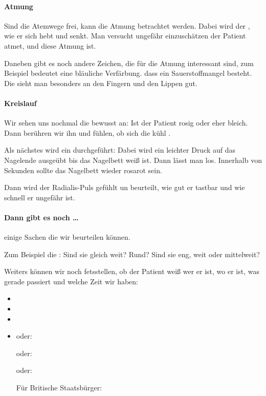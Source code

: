 \paragraph{Atmung} 
Sind die Atemwege frei, kann die Atmung
betrachtet werden. Dabei wird der , wie er sich hebt
und senkt. Man versucht ungefähr einzuschätzen 
der Patient atmet, und  diese Atmung ist.

Daneben gibt es noch andere Zeichen, die für die Atmung
interessant sind, zum Beispiel bedeutet eine bläuliche
Verfärbung. dass ein Sauerstoffmangel besteht. Die
 sieht man besonders an den Fingern und den
Lippen gut.


\paragraph{Kreislauf}

Wir sehen uns nochmal die  bewusst an: Ist
der Patient rosig oder eher bleich. Dann berühren wir ihn und
fühlen, ob sich die  kühl . 

Als nächstes wird ein  durchgeführt: Dabei
wird ein leichter Druck auf das Nagelende ausgeübt bis
das Nagelbett weiß ist. Dann lässt man los. Innerhalb von
 Sekunden sollte das Nagelbett wieder rosarot
sein. 



Dann wird der Radialis-Puls gefühlt un beurteilt, wie gut er
tastbar und wie schnell er ungefähr ist.




\paragraph{Dann gibt es noch \ldots}
einige Sachen die wir beurteilen können. 

Zum Beispiel die : Sind sie gleich weit? Rund?
Sind sie eng, weit oder mittelweit?

Weiters können wir noch fetsstellen, ob der Patient weiß wer
er ist, wo er ist, was gerade passiert und welche Zeit wir
haben:

\begin{itemize}
  \item {}
  \item {}
  \item {}
  \item {}
  
  oder: 
  
  oder: 
  
  oder: 
  
  Für Britische Staatsbürger: 
\end{itemize}


